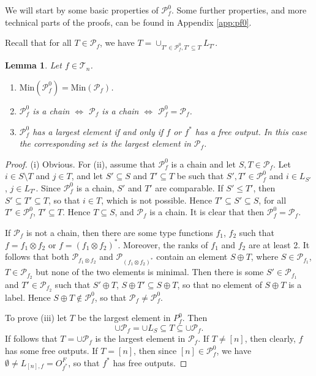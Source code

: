 \documentclass[12pt]{article}
\newtheorem{lemma}{Lemma}
\theoremstyle{definition}
\theoremstyle{remark}
\def\Te{\mathcal T}
\def\Pe{\mathcal P}
\begin{document}
We will start by some basic properties of $\Pe_f^0$. Some further properties, and more
technical parts of the proofs, can be found in Appendix \ref{app:pf0}. 

Recall that for all $T\in \Pe_f$, we have $T=\cup_{T'\in \Pe_f^0, T'\subseteq T} L_{T'}$.


\begin{lemma}\label{lemma:p0_basic} Let $f\in \Te_n$.
\begin{enumerate}
\item[(i)] $\mathrm{Min}(\Pe_f^0)=\mathrm{Min}(\Pe_f)$.
\item[(ii)] $\Pe_f^0$ is a chain $\iff$  $\Pe_f$ is a chain $\iff$  $\Pe_f^0= \Pe_f$.

\item[(iii)] $\Pe^0_f$ has a largest element if and only if $f$ or $f^*$ has a free
output. In this case  the corresponding set is the largest element in $\Pe_f$. 

\end{enumerate}
\end{lemma}


\begin{proof} 
(i) Obvious. For (ii), assume that $\Pe^0_f$ is a chain and let $S,T\in \Pe_f$. Let $i\in
S\setminus T$ and $j\in T$, and let $S'\subseteq  S$ and $T'\subseteq  T$ be such that $S',T'\in
\Pe_f^0$ and $i\in L_{S'}$, 
$j\in L_{T'}$. Since $\Pe_f^0$ is a chain, $S'$ and $T'$ are comparable. If $S'\le T'$,
then $S'\subseteq  T'\subseteq  T$, so that $i\in T$, which is not possible. Hence
$T'\subseteq S' \subseteq S$, for all $T'\in \Pe_f^0$, $T'\subseteq T$. Hence $T\subseteq
S$, and $\Pe_f$ is a chain. It is clear that then $\Pe_f^0=\Pe_f$.  

If $\Pe_f$ is not a chain, then there are some type
functions
$f_1$, $f_2$ such that $f=f_1\otimes f_2$ or $f=(f_1\otimes f_2)^*$. Moreover, the ranks
of $f_1$ and $f_2$ are at least 2. It follows that both $\Pe_{f_1\otimes f_2}$ and
$\Pe_{(f_1\otimes f_2)^*}$ contain an element $S\oplus T$, where $S\in \Pe_{f_1}$, $T\in
\Pe_{f_2}$ but none of the two elements is minimal. Then there is some $S'\in \Pe_{f_1}$
and $T'\in \Pe_{f_2}$ such that $S'\oplus T$, $S\oplus T'\subseteq S\oplus T$, so that no
element of $S\oplus T$ is a label. Hence
$S\oplus T\notin
\Pe_f^0$, so that $\Pe_f\ne \Pe_f^0$. 

To prove (iii) let $T$ be the largest element in $P^0_f$. Then 
\[
\cup\Pe_f=\cup L_S \subseteq T\subseteq \cup \Pe_f.
\]
 If follows that $T=\cup\Pe_f $ is the largest element in $\Pe_f$. If $T\ne [n]$, then
 clearly, $f$ has some free outputs. If $T=[n]$, then since $[n]\in \Pe_f^0$, we have
 $\emptyset\ne L_{[n],f}=O_{f^*}^F$, so that $f^*$ has free outputs.

\end{proof}
\end{document}
